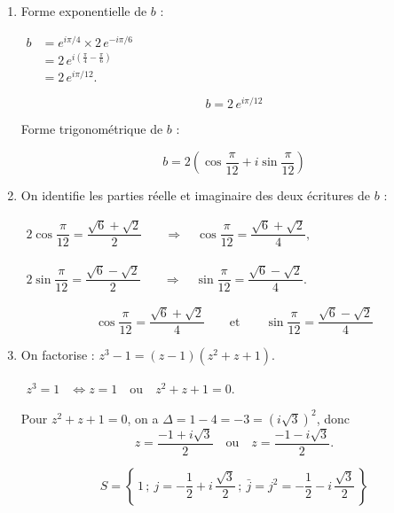 \documentclass[12pt,a4paper]{article}
\begin{document}
\begin{enumerate}
\begin{enumerate}
    \[
    \boxed{b = \dfrac{\sqrt6 + \sqrt2}{2} + i\,\dfrac{\sqrt6 - \sqrt2}{2}}
    \]

    \item Forme exponentielle de $b$ :

    $
    \begin{aligned}
    b &= e^{i\pi/4}\times 2\,e^{-i\pi/6} \\[1mm]
      &= 2\,e^{i\left(\frac{\pi}{4} - \frac{\pi}{6}\right)} \\[1mm]
      &= 2\,e^{i\pi/12}.
    \end{aligned}
    $

    \[
    \boxed{b = 2\,e^{i\pi/12}}
    \]

    Forme trigonométrique de $b$ :

    \[
    \boxed{b = 2\left(\cos\dfrac{\pi}{12} + i\sin\dfrac{\pi}{12}\right)}
    \]

    \item On identifie les parties réelle et imaginaire des deux écritures de $b$ :

    $
    \begin{aligned}
    2\cos\dfrac{\pi}{12} = \dfrac{\sqrt6 + \sqrt2}{2}
    \quad &\Longrightarrow \quad
    \cos\dfrac{\pi}{12} = \dfrac{\sqrt6 + \sqrt2}{4},
    \end{aligned}
    $

    $
    \begin{aligned}
    2\sin\dfrac{\pi}{12} = \dfrac{\sqrt6 - \sqrt2}{2}
    \quad &\Longrightarrow \quad
    \sin\dfrac{\pi}{12} = \dfrac{\sqrt6 - \sqrt2}{4}.
    \end{aligned}
    $

    \[
    \boxed{\cos\dfrac{\pi}{12} = \dfrac{\sqrt6 + \sqrt2}{4} \qquad \text{et} \qquad \sin\dfrac{\pi}{12} = \dfrac{\sqrt6 - \sqrt2}{4}}
    \]

    \item On factorise : $z^3 - 1 = (z - 1)(z^2 + z + 1)$.

    $
    \begin{aligned}
    z^3 = 1 &\iff z = 1 \quad \text{ou} \quad z^2 + z + 1 = 0.
    \end{aligned}
    $

    Pour $z^2 + z + 1 = 0$, on a $\Delta = 1 - 4 = -3 = \left(i\sqrt3\right)^2$, donc
    \[
    z = \dfrac{-1 + i\sqrt3}{2} \quad \text{ou} \quad z = \dfrac{-1 - i\sqrt3}{2}.
    \]

    \[
    \boxed{S = \left\{\,1\,;\ j = -\dfrac12 + i\,\dfrac{\sqrt3}{2}\,;\ \bar{j} = j^2 = -\dfrac12 - i\,\dfrac{\sqrt3}{2}\,\right\}}
    \]


\end{enumerate}
\end{enumerate}
\end{document}
